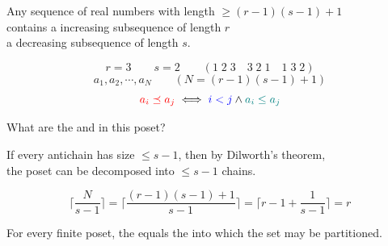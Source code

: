 \begin{frame}{}
  \begin{theorem}
    Any sequence of  real numbers
    with length $\ge (r - 1)(s - 1) + 1$ \\[3pt]
    contains a  increasing subsequence of length $r$ \\[3pt]
     a  decreasing subsequence of length $s$.
  \end{theorem}

  \pause
  \vspace{-0.20cm}
  \[
    r = 3 \qquad s = 2  \qquad (1\;2\;3 \quad 3\;2\;1 \quad 1\;3\;2)
  \]
  \pause
  \vspace{-0.30cm}
  \[
    a_{1}, a_{2}, \cdots, a_{N} \qquad (N = (r - 1)(s - 1) + 1)
  \]
  \pause
  \vspace{-0.30cm}
  \[
    \textcolor{red}{a_{i} \preceq a_{j}} \iff \textcolor{blue}{i < j} \land \textcolor{teal}{a_{i} \le a_{j}}
  \]

  \pause
  \vspace{0.30cm}
  \begin{center}
    What are the  and  in this poset?

    \pause
    \vspace{0.20cm}
    If every antichain has size $\le s - 1$, then by Dilworth's theorem, \\[3pt]
    the poset can be decomposed into $\le s - 1$ chains.
  \end{center}

  \pause
  \vspace{-0.20cm}
  \[
    \lceil \frac{N}{s - 1} \rceil
    = \lceil \frac{(r - 1)(s - 1) + 1}{s - 1} \rceil
    = \lceil r - 1 + \frac{1}{s - 1} \rceil
    = r
  \]
\end{frame}

\begin{frame}{}
  \begin{theorem}
    For every finite poset,
    the  equals the 
    into which the set may be partitioned.
  \end{theorem}

  \vspace{1em}
\end{frame}
